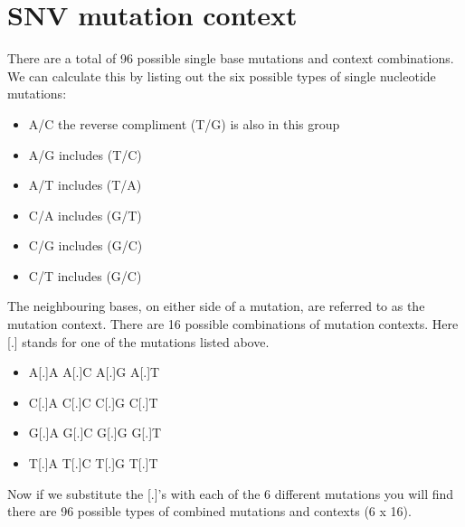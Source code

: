 \section{SNV mutation context}

\begin{information}
There are a total of 96 possible single base mutations and context combinations.
We can calculate this by listing out the six possible types of single
nucleotide mutations:
\vspace{4 mm}
\begin{itemize}
\item A/C \hspace{5 mm} the reverse compliment (T/G) is also in this group
\item A/G \hspace{5 mm} includes (T/C)
\item A/T \hspace{5 mm} includes (T/A)
\item C/A \hspace{5 mm} includes (G/T)
\item C/G \hspace{5 mm} includes (G/C)
\item C/T \hspace{5 mm} includes (G/C)
\end{itemize}
\vspace{4 mm}
The neighbouring bases, on either side of a mutation, are referred to as the mutation context. 
There are 16 possible combinations of mutation contexts. Here [.] stands for one of the mutations listed above.
\vspace{4 mm}
\begin{itemize}
\item A[.]A \hspace{5 mm} A[.]C \hspace{5 mm} A[.]G \hspace{5 mm} A[.]T
\item C[.]A \hspace{5 mm} C[.]C \hspace{5 mm} C[.]G \hspace{5 mm} C[.]T
\item G[.]A \hspace{5 mm} G[.]C \hspace{5 mm} G[.]G \hspace{5 mm} G[.]T
\item T[.]A \hspace{5 mm} T[.]C \hspace{5 mm} T[.]G \hspace{5 mm} T[.]T
\end{itemize}
\vspace{4 mm}
Now if we substitute the [.]'s with each of the 6 different mutations you will find there are 96 possible types of combined mutations and contexts (6 x 16). 


\end{information}
